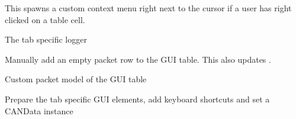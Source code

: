 \documentclass[letterpaper,10pt,english]{sphinxmanual}
\begin{document}
\begin{fulllineitems}
\begin{fulllineitems}
\begin{itemize}
\end{itemize}

\end{fulllineitems}


\begin{fulllineitems}
\label{\detokenize{src:src.AbstractTab.AbstractTab.handleRightCick}}
This spawns a custom context menu right next to the cursor if a user has right clicked on a table cell.

\end{fulllineitems}


\begin{fulllineitems}
\label{\detokenize{src:src.AbstractTab.AbstractTab.loggerName}}
The tab specific logger

\end{fulllineitems}


\begin{fulllineitems}
\label{\detokenize{src:src.AbstractTab.AbstractTab.manualAddPacket}}
Manually add an empty packet row to the GUI table. This also updates .

\end{fulllineitems}


\begin{fulllineitems}
\label{\detokenize{src:src.AbstractTab.AbstractTab.packetTableModel}}
Custom packet model of the GUI table

\end{fulllineitems}


\begin{fulllineitems}
\label{\detokenize{src:src.AbstractTab.AbstractTab.prepareUI}}
Prepare the tab specific GUI elements, add keyboard shortcuts and set a CANData instance


\end{fulllineitems}
\end{fulllineitems}
\end{document}
